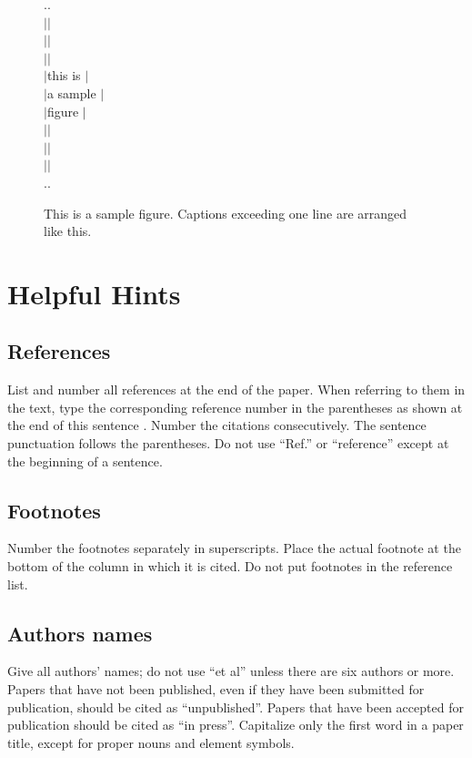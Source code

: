 \documentclass[twocolumn,a4paper]{article}
\begin{document}
\begin{figure}[tb]
\begin{center}
\begin{minipage}{5cm}
$.$\hrulefill $.$\\$|$\hfill $|$\\$|$\hfill $|$\\$|$\hfill $|$\\
$|$\hfill this is \hfill $|$\\
$|$\hfill a sample \hfill $|$\\
$|$\hfill  figure  \hfill $|$\\
$|$\hfill $|$\\$|$\hfill $|$\\$|$\hfill $|$\\$.$\hrulefill $.$\\
\end{minipage}
\caption{This is a sample figure. Captions exceeding
one line are arranged like this.}
\end{center}
\end{figure}

\section{Helpful Hints}

\subsection{References}
List and number all references at the end of the paper. When referring
to them in the text, type the corresponding reference number in the
parentheses as shown at the end of this sentence \cite{key}. Number
the citations consecutively. The sentence punctuation follows the
parentheses. Do not use ``Ref.\cite{baz}'' or
``reference\cite{baz}'' except at the beginning of a sentence.

\subsection{Footnotes}
Number the footnotes separately in superscripts. Place the actual
footnote at the bottom of the column in which it is cited. Do not put
footnotes in the reference list.

\subsection{Authors names}

Give all authors' names; do not use ``et al'' unless there are six
authors or more. Papers that have not been published, even if they have
been submitted for publication, should be cited as
``unpublished''\cite{unpub}.  Papers that have been accepted for
publication should be cited as ``in press''\cite{inpress}.
Capitalize only the first word in a paper title, except for proper nouns
and element symbols.
\end{document}
